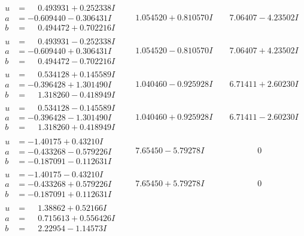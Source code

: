 \documentclass[1p]{elsarticle_modified}
\theoremstyle{definition}
\begin{document}
$$\begin{array}{c|c|c}
\begin{aligned}
u &= \phantom{-}0.493931 + 0.252338 I \\
a &= -0.609440 - 0.306431 I \\
b &= \phantom{-}0.494472 + 0.702216 I\end{aligned}
 & \phantom{-}1.054520 + 0.810570 I & \phantom{-}7.06407 - 4.23502 I \\ \hline\begin{aligned}
u &= \phantom{-}0.493931 - 0.252338 I \\
a &= -0.609440 + 0.306431 I \\
b &= \phantom{-}0.494472 - 0.702216 I\end{aligned}
 & \phantom{-}1.054520 - 0.810570 I & \phantom{-}7.06407 + 4.23502 I \\ \hline\begin{aligned}
u &= \phantom{-}0.534128 + 0.145589 I \\
a &= -0.396428 + 1.301490 I \\
b &= \phantom{-}1.318260 - 0.418949 I\end{aligned}
 & \phantom{-}1.040460 - 0.925928 I & \phantom{-}6.71411 + 2.60230 I \\ \hline\begin{aligned}
u &= \phantom{-}0.534128 - 0.145589 I \\
a &= -0.396428 - 1.301490 I \\
b &= \phantom{-}1.318260 + 0.418949 I\end{aligned}
 & \phantom{-}1.040460 + 0.925928 I & \phantom{-}6.71411 - 2.60230 I \\ \hline\begin{aligned}
u &= -1.40175 + 0.43210 I \\
a &= -0.433268 - 0.579226 I \\
b &= -0.187091 - 0.112631 I\end{aligned}
 & \phantom{-}7.65450 - 5.79278 I & \phantom{-0.000000 } 0 \\ \hline\begin{aligned}
u &= -1.40175 - 0.43210 I \\
a &= -0.433268 + 0.579226 I \\
b &= -0.187091 + 0.112631 I\end{aligned}
 & \phantom{-}7.65450 + 5.79278 I & \phantom{-0.000000 } 0 \\ \hline\begin{aligned}
u &= \phantom{-}1.38862 + 0.52166 I \\
a &= \phantom{-}0.715613 + 0.556426 I \\
b &= \phantom{-}2.22954 - 1.14573 I\end{aligned}

\end{array}$$
\end{document}
